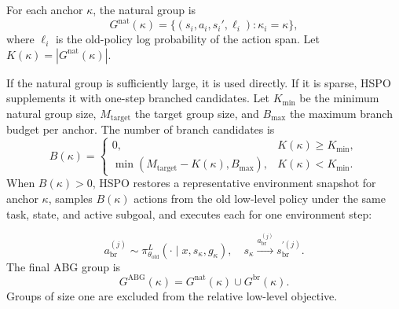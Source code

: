 \documentclass{article}
\newcommand{\wei}[1]{\textcolor{red}{#1}}
\begin{document}
For each anchor $\kappa$, the natural group is
\begin{equation}
G^{\mathrm{nat}}(\kappa)
=
\{(s_i,a_i,s_i',\ell_i):\kappa_i=\kappa\},
\label{eq:natural_group}
\end{equation}
where $\ell_i$ is the old-policy log probability of the action span. Let $K(\kappa)=|G^{\mathrm{nat}}(\kappa)|$.

If the natural group is sufficiently large, it is used directly. If it is sparse, HSPO supplements it with one-step branched candidates. Let $K_{\min}$ be the minimum natural group size, $M_{\mathrm{target}}$ the target group size, and $B_{\max}$ the maximum branch budget per anchor. The number of branch candidates is
\begin{equation}
B(\kappa)
=
\begin{cases}
0, & K(\kappa)\geq K_{\min},\\
\min(M_{\mathrm{target}}-K(\kappa),B_{\max}), & K(\kappa)<K_{\min}.
\end{cases}
\label{eq:branch_budget}
\end{equation}
When $B(\kappa)>0$, HSPO restores a representative environment snapshot for anchor $\kappa$, samples $B(\kappa)$ actions from the old low-level policy under the same task, state, and active subgoal, and executes each for one environment step:




\begin{equation}
a_{\mathrm{br}}^{(j)}
\sim
\pi_{\theta_{\mathrm{old}}}^{L}(\cdot\mid x,s_\kappa,g_\kappa),
\quad
s_\kappa \xrightarrow{a_{\mathrm{br}}^{(j)}} s_{\mathrm{br}}^{\prime(j)}.
\label{eq:branching}
\end{equation}
The final ABG group is
\begin{equation}
G^{\mathrm{ABG}}(\kappa)
=
G^{\mathrm{nat}}(\kappa)\cup G^{\mathrm{br}}(\kappa).
\label{eq:abg_group}
\end{equation}
Groups of size one are excluded from the relative low-level objective. %
\end{document}
